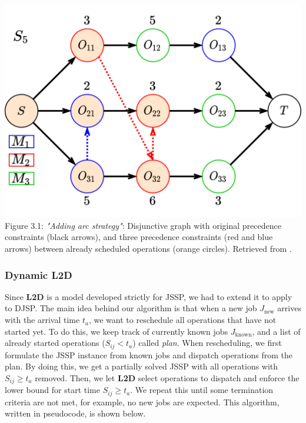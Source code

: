 \begin{center}
    \includegraphics[width=0.75\linewidth]{images/jssp_adding_arcs.pdf}\\
    Figure 3.1: \textit{"Adding arc strategy"}: Disjunctive graph with original precedence constraints (black arrows), and three precedence constraints (red and blue arrows) between already scheduled operations (orange circles). Retrieved from \cite{zhang2020learning}.
\end{center}

\subsubsection{Dynamic L2D}

Since \textbf{L2D} is a model developed strictly for JSSP, we had to extend it to apply to DJSP. The main idea behind our algorithm is that when a new job $J_\text{new}$ arrives with the arrival time $t_a$, we want to reschedule all operations that have not started yet. To do this, we keep track of currently known jobs $J_\text{known}$, and a list of already started operations ($S_{ij} < t_a$) called \textit{plan}. When rescheduling, we first formulate the JSSP instance from known jobs and dispatch operations from the plan. By doing this, we get a partially solved JSSP with all operations with $S_{ij} \geq t_a$ removed. Then, we let \textbf{L2D} select operations to dispatch and enforce the lower bound for start time $S_{ij} \geq  t_a$. We repeat this until some termination criteria are not met, for example, no new jobs are expected. This algorithm, written in pseudocode, is shown below.

